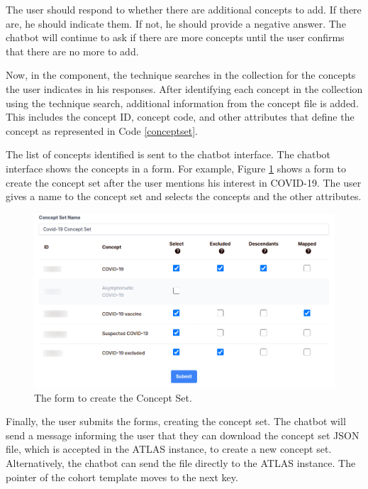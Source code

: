 The user should respond to whether there are additional concepts to add. If there are, he should indicate them. If not, he should provide a negative answer. The chatbot will continue to ask if there are more concepts until the user confirms that there are no more to add.

Now, in the {\ir} component, the {\bm} technique searches in the collection for the concepts the user indicates in his responses. After identifying each concept in the collection using the {\ir} technique search, additional information from the concept file is added. This includes the concept ID, concept code, and other attributes that define the concept as represented in Code \ref{conceptset}.

The list of concepts identified is sent to the chatbot interface. The chatbot interface shows the concepts in a form. For example, Figure \ref{fig_forms} shows a form to create the concept set after the user mentions his interest in COVID-19. The user gives a name to the concept set and selects the concepts and the other attributes.


\begin{figure}[H]
  \includegraphics[width=1\textwidth]{figs/chapter4/form.png}
  \centering
  \caption{The form to create the Concept Set.}
  \label{fig_forms}
\end{figure}


Finally, the user submits the forms, creating the concept set. The chatbot will send a message informing the user that they can download the concept set JSON file, which is accepted in the ATLAS instance, to create a new concept set. Alternatively, the chatbot can send the file directly to the ATLAS instance. The pointer of the cohort template moves to the next key.




